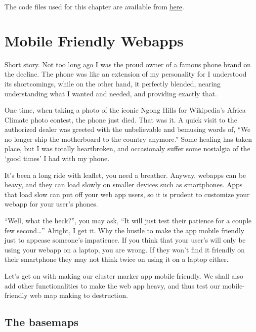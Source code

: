 \documentclass[
]{book}
\begin{document}
The code files used for this chapter are available from \href{https://www.dropbox.com/scl/fo/vbyxk75jodchlgxb4obkl/h?dl=0\&rlkey=x5jya8iwtj431uwxte7usdvpa}{here}.

\hypertarget{mobile-friendly-webapps}{%
\chapter{Mobile Friendly Webapps}\label{mobile-friendly-webapps}}

Short story. Not too long ago I was the proud owner of a famous phone brand on the decline. The phone was like an extension of my personality for I understood its shortcomings, while on the other hand, it perfectly blended, nearing understanding what I wanted and needed, and providing exactly that.

One time, when taking a photo of the iconic Ngong Hills for Wikipedia's Africa Climate photo contest, the phone just died. That was it. A quick visit to the authorized dealer was greeted with the unbelievable and bemusing words of, ``We no longer ship the motherboard to the country anymore.'' Some healing has taken place, but I was totally heartbroken, and occasionaly suffer some nostalgia of the `good times' I had with my phone.

It's been a long ride with leaflet, you need a breather. Anyway, webapps can be heavy, and they can load slowly on smaller devices such as smartphones. Apps that load slow can put off your web app users, so it is prudent to customize your webapp for your user's phones.

``Well, what the heck?'', you may ask, ``It will just test their patience for a couple few second\ldots{}'' Alright, I get it. Why the hustle to make the app mobile friendly just to appease someone's impatience. If you think that your user's will only be using your webapp on a laptop, you are wrong. If they won't find it friendly on their smartphone they may not think twice on using it on a laptop either.

Let's get on with making our cluster marker app mobile friendly. We shall also add other functionalities to make the web app heavy, and thus test our mobile-friendly web map making to destruction.

\hypertarget{the-basemaps}{%
\section{The basemaps}\label{the-basemaps}}
\end{document}
